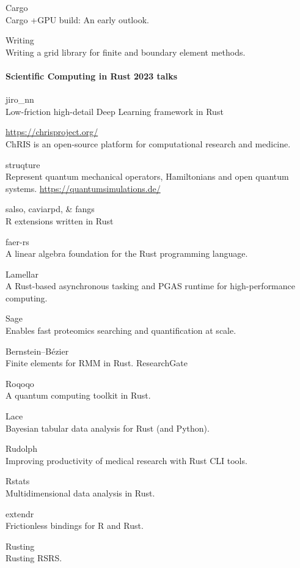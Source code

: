 \documentclass{article}
\begin{document}
Cargo\\
Cargo +GPU build: An early outlook.

Writing\\
Writing a grid library for finite and boundary element methods.

\paragraph{Scientific Computing in Rust 2023 talks}

jiro\_nn\\
Low-friction high-detail Deep Learning framework in Rust

\url{https://chrisproject.org/}\\
ChRIS is an open-source platform for computational research and medicine.

struqture\\
Represent quantum mechanical operators, Hamiltonians and open quantum systems.
\url{https://quantumsimulations.de/}

salso, caviarpd, \& fangs\\
R extensions written in Rust

faer-rs\\
A linear algebra foundation for the Rust programming language.

Lamellar\\
A Rust-based asynchronous tasking and PGAS runtime for high-performance computing.

Sage\\
Enables fast proteomics searching and quantification at scale.

Bernstein–Bézier\\
Finite elements for RMM in Rust. ResearchGate

Roqoqo\\
A quantum computing toolkit in Rust.

Lace\\
Bayesian tabular data analysis for Rust (and Python).

Rudolph\\
Improving productivity of medical research with Rust CLI tools.

Rstats\\
Multidimensional data analysis in Rust.

extendr\\
Frictionless bindings for R and Rust.

Rusting\\
Rusting RSRS.
\end{document}
